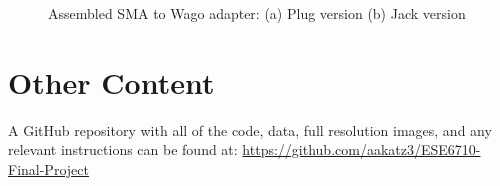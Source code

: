 \begin{appendices}
\begin{figure}[H]
        \caption{
            \centering
            Assembled SMA to Wago adapter:\quad
            (a) Plug version
            (b) Jack version
        }
        \label{fig:board_sma-wago}
    \end{figure}
    \begin{table}[H]
        \centering
        
        \caption{BOM for the SMA to Wago adapter}
    \end{table}
    \section{Other Content}
    \raggedright
    
    A GitHub repository with all of the code, data, full resolution images, and any relevant instructions can be found at:
    \url{https://github.com/aakatz3/ESE6710-Final-Project}
    

\end{appendices}

